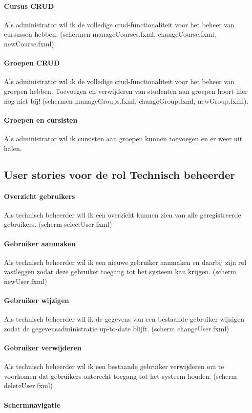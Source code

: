 \documentclass[11pt, a4paper]{article}
\begin{document}
\paragraph{Cursus CRUD}
Als administrator wil ik de volledige crud-functionaliteit voor het beheer van cursussen hebben. (schermen manageCourses.fxml, changeCourse.fxml, newCourse.fxml).

\paragraph{Groepen CRUD}
Als administrator wil ik de volledige crud-functionaliteit voor het beheer van groepen hebben. Toevoegen en verwijderen van studenten aan groepen hoort hier nog niet bij! (schermen manageGroups.fxml, changeGroup.fxml, newGroup.fxml).

\paragraph{Groepen en cursisten}
Als administrator wil ik cursisten aan groepen kunnen toevoegen en er weer uit halen.

\subsection{User stories voor de rol Technisch beheerder}

\paragraph{Overzicht gebruikers} Als technisch beheerder wil ik een overzicht kunnen zien van alle geregistreerde gebruikers. (scherm selectUser.fxml)

\paragraph{Gebruiker aanmaken} Als technisch beheerder wil ik een nieuwe gebruiker aanmaken en daarbij zijn rol vastleggen zodat deze gebruiker toegang tot het systeem kan krijgen. (scherm newUser.fxml)

\paragraph{Gebruiker wijzigen} Als technisch beheerder wil ik de gegevens van een bestaande gebruiker wijzigen zodat de gegevensadministratie up-to-date blijft. (scherm changeUser.fxml)

\paragraph{Gebruiker verwijderen} Als technisch beheerder wil ik een bestaande gebruiker verwijderen om te voorkomen dat gebruikers onterecht toegang tot het systeem houden. (scherm deleteUser.fxml)

\paragraph{Schermnavigatie} 
\end{document}
